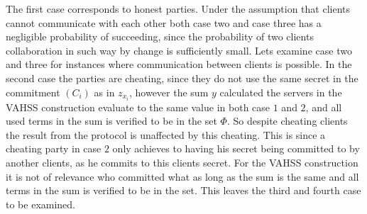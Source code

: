 The first case corresponds to honest parties. 
Under the assumption that clients cannot communicate with each other both case two and case three has a negligible probability of succeeding, since the probability of two clients collaboration in such way by change is sufficiently small. Lets examine case two and three for instances where communication between clients is possible. In the second case the parties are cheating, since they do not use the same secret in the commitment $(C_i)$ as in $z_{x_i}$, however the sum $y$ calculated the servers in the VAHSS construction evaluate to the same value in both case $1$ and $2$, and all used terms in the sum is verified to be in the set $\Phi$. So despite cheating clients the result from the protocol is unaffected by this cheating. This is since a cheating party in case $2$ only achieves to having his secret being committed to by another clients, as he commits to this clients secret. For the VAHSS construction it is not of relevance who committed what as long as the sum is the same and all terms in the sum is verified to be in the set.  This leaves the third and fourth case to be examined. 





